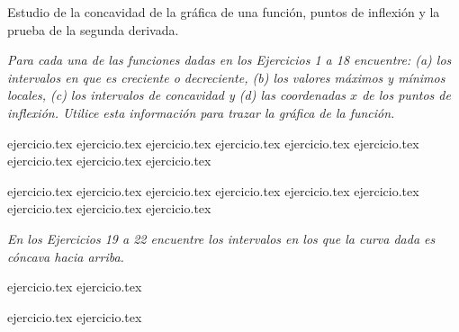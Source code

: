
Estudio de la concavidad de la gráfica de una función, puntos de inflexión y la prueba de la segunda derivada.

\noindent \textit{Para cada una de las funciones dadas en los Ejercicios 1 a 18 encuentre: (a) los intervalos en que es creciente o decreciente, (b) los valores máximos y mínimos locales, (c) los intervalos de concavidad y (d) las coordenadas $x$ de los puntos de inflexión. Utilice esta información para trazar la gráfica de la función.}

\begin{enumerate}
    \begin{minipage}{0.45\textwidth}
    {ejercicio.tex}
    {ejercicio.tex}
    {ejercicio.tex}
    {ejercicio.tex}
    {ejercicio.tex}
    {ejercicio.tex}
    {ejercicio.tex}
    {ejercicio.tex}
    {ejercicio.tex}
    \end{minipage}%
    \begin{minipage}{0.45\textwidth}
    \setcounter{enumi}{9}
    {ejercicio.tex}
    {ejercicio.tex}
    {ejercicio.tex}
    {ejercicio.tex}
    {ejercicio.tex}
    {ejercicio.tex}
    {ejercicio.tex}
    {ejercicio.tex}
    {ejercicio.tex}
    \end{minipage}
\end{enumerate}

\vspace{1em}
\noindent \textit{En los Ejercicios 19 a 22 encuentre los intervalos en los que la curva dada es cóncava hacia arriba.}

\begin{enumerate}
    \setcounter{enumi}{18}
    \begin{minipage}{0.45\textwidth}
    {ejercicio.tex}
    {ejercicio.tex}
    \end{minipage}%
    \begin{minipage}{0.45\textwidth}
    {ejercicio.tex}
    {ejercicio.tex}
    \end{minipage}
\end{enumerate}

